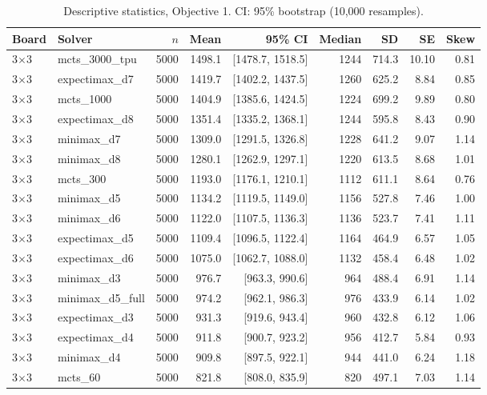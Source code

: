 {\footnotesize
\begin{longtable}{llrrrrrrr}
\caption{Descriptive statistics, Objective 1. CI: 95\% bootstrap (10{,}000 resamples).}\label{tab:desc_obj1}\\
\toprule
Board & Solver & $n$ & Mean & 95\% CI & Median & SD & SE & Skew \\
\midrule
\endhead
3$\times$3 & mcts\_3000\_tpu & 5000 & 1498.1 & [1478.7, 1518.5] & 1244 & 714.3 & 10.10 & 0.81 \\
3$\times$3 & expectimax\_d7 & 5000 & 1419.7 & [1402.2, 1437.5] & 1260 & 625.2 & 8.84 & 0.85 \\
3$\times$3 & mcts\_1000 & 5000 & 1404.9 & [1385.6, 1424.5] & 1224 & 699.2 & 9.89 & 0.80 \\
3$\times$3 & expectimax\_d8 & 5000 & 1351.4 & [1335.2, 1368.1] & 1244 & 595.8 & 8.43 & 0.90 \\
3$\times$3 & minimax\_d7 & 5000 & 1309.0 & [1291.5, 1326.8] & 1228 & 641.2 & 9.07 & 1.14 \\
3$\times$3 & minimax\_d8 & 5000 & 1280.1 & [1262.9, 1297.1] & 1220 & 613.5 & 8.68 & 1.01 \\
3$\times$3 & mcts\_300 & 5000 & 1193.0 & [1176.1, 1210.1] & 1112 & 611.1 & 8.64 & 0.76 \\
3$\times$3 & minimax\_d5 & 5000 & 1134.2 & [1119.5, 1149.0] & 1156 & 527.8 & 7.46 & 1.00 \\
3$\times$3 & minimax\_d6 & 5000 & 1122.0 & [1107.5, 1136.3] & 1136 & 523.7 & 7.41 & 1.11 \\
3$\times$3 & expectimax\_d5 & 5000 & 1109.4 & [1096.5, 1122.4] & 1164 & 464.9 & 6.57 & 1.05 \\
3$\times$3 & expectimax\_d6 & 5000 & 1075.0 & [1062.7, 1088.0] & 1132 & 458.4 & 6.48 & 1.02 \\
3$\times$3 & minimax\_d3 & 5000 & 976.7 & [963.3, 990.6] & 964 & 488.4 & 6.91 & 1.14 \\
3$\times$3 & minimax\_d5\_full & 5000 & 974.2 & [962.1, 986.3] & 976 & 433.9 & 6.14 & 1.02 \\
3$\times$3 & expectimax\_d3 & 5000 & 931.3 & [919.6, 943.4] & 960 & 432.8 & 6.12 & 1.06 \\
3$\times$3 & expectimax\_d4 & 5000 & 911.8 & [900.7, 923.2] & 956 & 412.7 & 5.84 & 0.93 \\
3$\times$3 & minimax\_d4 & 5000 & 909.8 & [897.5, 922.1] & 944 & 441.0 & 6.24 & 1.18 \\
3$\times$3 & mcts\_60 & 5000 & 821.8 & [808.0, 835.9] & 820 & 497.1 & 7.03 & 1.14 \\

\end{longtable}}
